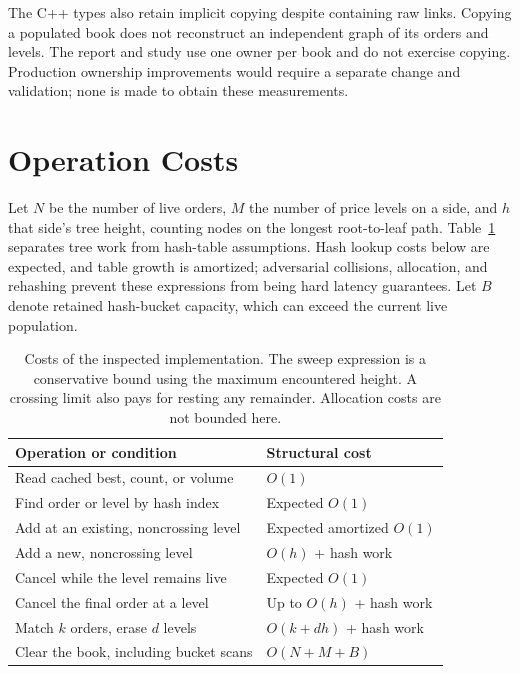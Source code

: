 \documentclass[10pt,letterpaper,twocolumn]{article}
\begin{document}
The C++ types also retain implicit copying despite containing raw links.
Copying a populated book does not reconstruct an independent graph of its
orders and levels. The report and study use one owner per book and do not
exercise copying. Production ownership improvements would require a separate
change and validation; none is made to obtain these measurements.

\section{Operation Costs}\label{sec:complexity}
Let $N$ be the number of live orders, $M$ the number of price levels on a side,
and $h$ that side's tree height, counting nodes on the longest root-to-leaf
path. Table~\ref{tab:complexity} separates tree work
from hash-table assumptions. Hash lookup costs below are expected, and table
growth is amortized; adversarial collisions, allocation, and rehashing prevent
these expressions from being hard latency guarantees. Let $B$ denote retained
hash-bucket capacity, which can exceed the current live population.

\begin{table}[t]
\centering\small
\begin{tabularx}{\columnwidth}{@{}Xl@{}}
\toprule
Operation or condition & Structural cost\\
\midrule
Read cached best, count, or volume & $O(1)$\\
Find order or level by hash index & Expected $O(1)$\\
Add at an existing, noncrossing level & Expected amortized $O(1)$\\
Add a new, noncrossing level & $O(h)$ + hash work\\
Cancel while the level remains live & Expected $O(1)$\\
Cancel the final order at a level & Up to $O(h)$ + hash work\\
Match $k$ orders, erase $d$ levels & $O(k+dh)$ + hash work\\
Clear the book, including bucket scans & $O(N+M+B)$\\
\bottomrule
\end{tabularx}
\caption{Costs of the inspected implementation. The sweep expression is a
conservative bound using the maximum encountered height. A crossing limit
also pays for resting any remainder. Allocation costs are not bounded here.}
\label{tab:complexity}
\end{table}
\end{document}
